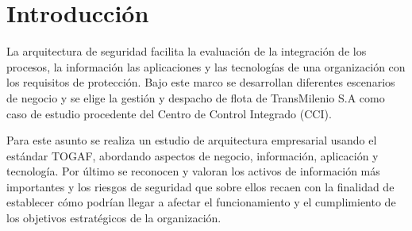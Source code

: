 \section{Introducción}
La arquitectura de seguridad facilita la evaluación de la integración de los procesos, la información las aplicaciones y las tecnologías de una organización con los requisitos de protección. Bajo este marco se desarrollan diferentes escenarios de negocio y se elige la gestión y despacho de flota de TransMilenio S.A como caso de estudio procedente del Centro de Control Integrado (CCI).

Para este asunto se realiza un estudio de arquitectura empresarial usando el estándar TOGAF, abordando aspectos de negocio, información, aplicación y tecnología. Por último se reconocen y valoran los activos de información más importantes y los riesgos de seguridad que sobre ellos recaen con la finalidad de establecer cómo podrían llegar a afectar el funcionamiento y el cumplimiento de los objetivos estratégicos de la organización.